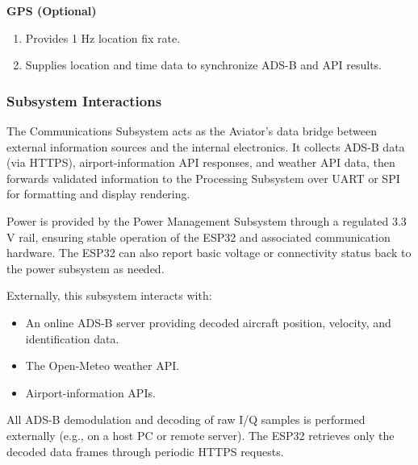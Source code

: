 \textbf{GPS (Optional)}
\begin{enumerate}
    \item Provides 1 Hz location fix rate.
    \item Supplies location and time data to synchronize ADS-B and API results.
\end{enumerate}

\subsubsection{Subsystem Interactions}
The Communications Subsystem acts as the Aviator’s data bridge between external information sources and the internal electronics. It collects ADS-B data (via HTTPS), airport-information API responses, and weather API data, then forwards validated information to the Processing Subsystem over UART or SPI for formatting and display rendering.

Power is provided by the Power Management Subsystem through a regulated 3.3 V rail, ensuring stable operation of the ESP32 and associated communication hardware. The ESP32 can also report basic voltage or connectivity status back to the power subsystem as needed.

Externally, this subsystem interacts with:
\begin{itemize}
    \item An online ADS-B server providing decoded aircraft position, velocity, and identification data.
    \item The Open-Meteo weather API.
    \item Airport-information APIs.
\end{itemize}

All ADS-B demodulation and decoding of raw I/Q samples is performed externally (e.g., on a host PC or remote server). The ESP32 retrieves only the decoded data frames through periodic HTTPS requests.

